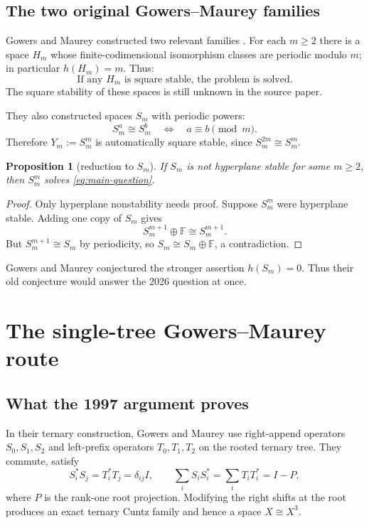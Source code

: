 \documentclass[11pt]{article}
\newtheorem{proposition}[theorem]{Proposition}
\theoremstyle{definition}
\theoremstyle{remark}
\newcommand{\F}{\mathbb F}
\begin{document}
\subsection{The two original Gowers--Maurey families}

Gowers and Maurey constructed two relevant families \cite{GowersMaurey1997}.
For each $m\ge2$ there is a space $H_m$ whose finite-codimensional isomorphism
classes are periodic modulo $m$; in particular $h(H_m)=m$.  Thus:
\[
 \boxed{\text{If any }H_m\text{ is square stable, the problem is solved.}}
\]
The square stability of these spaces is still unknown in the source paper.

They also constructed spaces $S_m$ with periodic powers:
\[
 S_m^a\cong S_m^b\quad\Longleftrightarrow\quad a\equiv b\pmod m.
\]
Therefore $Y_m:=S_m^m$ is automatically square stable, since
$S_m^{2m}\cong S_m^m$.

\begin{proposition}[reduction to $S_m$]\label{prop:Sm-reduction}
If $S_m$ is not hyperplane stable for some $m\ge2$, then $S_m^m$ solves
\eqref{eq:main-question}.
\end{proposition}

\begin{proof}
Only hyperplane nonstability needs proof.  Suppose $S_m^m$ were hyperplane
stable.  Adding one copy of $S_m$ gives
\[
 S_m^{m+1}\oplus\F\cong S_m^{m+1}.
\]
But $S_m^{m+1}\cong S_m$ by periodicity, so $S_m\cong S_m\oplus\F$, a
contradiction.
\end{proof}

Gowers and Maurey conjectured the stronger assertion $h(S_m)=0$.  Thus their
old conjecture would answer the 2026 question at once.

\section{The single-tree Gowers--Maurey route}

\subsection{What the 1997 argument proves}

In their ternary construction, Gowers and Maurey use right-append operators
$S_0,S_1,S_2$ and left-prefix operators $T_0,T_1,T_2$ on the rooted ternary
tree.  They commute, satisfy
\[
 S_i^*S_j=T_i^*T_j=\delta_{ij}I,
 \qquad
 \sum_iS_iS_i^*=\sum_iT_iT_i^*=I-P,
\]
where $P$ is the rank-one root projection.  Modifying the right shifts at the
root produces an exact ternary Cuntz family and hence a space $X\cong X^3$.
\end{document}
